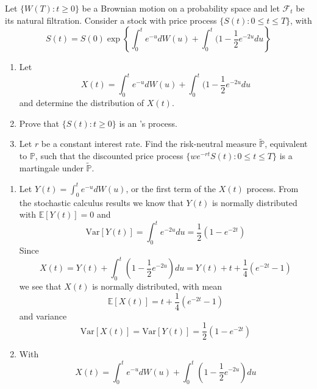 \documentclass[12pt,a4paper]{exam}
\begin{document}
\begin{questions}
\question Let $\{W(T):t\geq 0\}$ be a Brownian motion on a probability space and let $\mathcal{F}_t$ be its natural filtration. Consider a stock with price process $\{S(t):0\leq t \leq T\}$, with 
\begin{equation*}
S(t)=S(0)\exp\left\{\int_0^t e^{-u}dW(u) + \int_0^t(1-\frac{1}{2}e^{-2u}du\right\}
\end{equation*}
\begin{enumerate}[label=(\alph*),font=\itshape]
\item Let 
\begin{equation*}
X(t)=\int_0^t e^{-u}dW(u)+\int_0^t(1-\frac{1}{2}e^{-2u}du
\end{equation*}
and determine the distribution of $X(t)$.
\item Prove that $\{S(t):t\geq 0\}$ is an \ito's process.
\item Let $r$ be a constant interest rate. Find the risk-neutral measure $\tilde{\mathbb{P}}$, equivalent to $\mathbb{P}$, such that the discounted price process $\{we^{-rt}S(t): 0\leq t \leq T\}$ is a martingale under $\tilde{\mathbb{P}}$.
\end{enumerate}
\fillwithlines{3cm}
\begin{solution}
\begin{enumerate}[label=(\alph*),font=\itshape]
\item Let $Y(t)=\int_0^t e^{-u}dW(u)$, or the first term of the $X(t)$ process. From the stochastic calculus results we know that $Y(t)$ is normally distributed with $\mathbb{E}[Y(t)]=0$ and 
\begin{equation*}
\text{Var}[Y(t)]=\int_0^t e^{-2u}du = \frac{1}{2}(1-e^{-2t})
\end{equation*} 
Since 
\begin{equation*}
X(t) = Y(t) + \int_0^t (1-\frac{1}{2}e^{-2u})du = Y(t) + t + \frac{1}{4}(e^{-2t}-1)
\end{equation*} 
we see that $X(t)$ is normally distributed, with mean 
\begin{equation*}
\mathbb{E}[X(t)] = t + \frac{1}{4}(e^{-2t}-1)
\end{equation*} 
and variance
\begin{equation*}
\text{Var}[X(t)] = \text{Var}[Y(t)] = \frac{1}{2}(1-e^{-2t})
\end{equation*} 
\item With 
\begin{equation*}
X(t) = \int_0^t e^{-u}dW(u) + \int_0^t (1-\frac{1}{2}e^{-2u})du

\end{equation*}
\end{enumerate}
\end{solution}
\end{questions}
\end{document}
